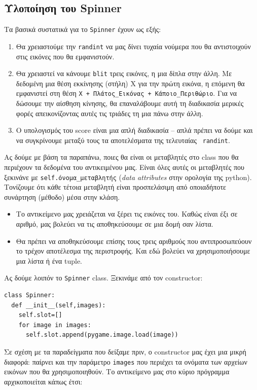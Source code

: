 \subsection{Υλοποίηση του Spinner}
%
Τα βασικά συστατικά για το {\tt Spinner} έχουν ως εξής:
%
\begin{enumerate}
\item Θα χρειαστούμε την {\tt randint} να μας δίνει τυχαία νούμερα που θα αντιστοιχούν στις εικόνες που θα εμφανιστούν.
\item Θα χρειαστεί να κάνουμε {\tt blit} τρεις εικόνες, η μια δίπλα στην άλλη. Με δεδομένη μια θέση εκκίνησης (στήλη) Χ για την πρώτη εικόνα, η επόμενη θα
εμφανιστεί στη θέση {\tt Χ + Πλάτος\_Εικόνας + Κάποιο\_Περιθώριο}. Για να δώσουμε την αίσθηση κίνησης, θα επαναλάβουμε αυτή τη διαδικασία μερικές φορές απεικονίζοντας αυτές τις τριάδες τη μια πάνω στην άλλη.
\item Ο υπολογισμός του score είναι μια απλή διαδικασία -- απλά πρέπει να
δούμε και να συγκρίνουμε μεταξύ τους τα αποτελέσματα της τελευταίας {\tt
randint}.
\end{enumerate}
%
Ας δούμε με βάση τα παραπάνω, ποιες θα είναι οι μεταβλητές στο class που θα
περιέχουν τα δεδομένα του αντικειμένου μας. Είναι όλες αυτές οι μεταβλητές
που ξεκινάνε με {\tt self.όνομα\_μεταβλητής} ({\em data attributes} στην ορολογία της python). Τονίζουμε ότι κάθε τέτοια μεταβλητή είναι προσπελάσιμη από οποιαδήποτε συνάρτηση (μέθοδο) μέσα στην κλάση.
%
\begin{itemize}
\item Το αντικείμενο μας χρειάζεται να ξέρει τις εικόνες του. Καθώς είναι έξι σε αριθμό, μας βολεύει να τις αποθηκεύσουμε σε μια δομή σαν λίστα.
\item Θα πρέπει να αποθηκεύσουμε επίσης τους τρεις αριθμούς που αντιπροσωπεύουν το τρέχον αποτέλεσμα της περιστροφής. Και εδώ βολεύει να χρησιμοποιήσουμε μια λίστα ή ένα tuple.
\end{itemize}
%
Ας δούμε λοιπόν το {\tt Spinner} class. Ξεκινάμε από τον constructor:

\begin{verbatim}
class Spinner:
  def __init__(self,images):
    self.slot=[]
    for image in images:
      self.slot.append(pygame.image.load(image))
\end{verbatim}

Σε σχέση με τα παραδείγματα που δείξαμε πριν, ο constructor μας έχει μια μικρή διαφορά: παίρνει και την παράμετρο {\tt images} που περιέχει τα ονόματα των αρχείων εικόνων που θα χρησιμοποιηθούν. Το αντικείμενο μας στο κύριο πρόγραμμα αρχικοποιείται κάπως έτσι:

